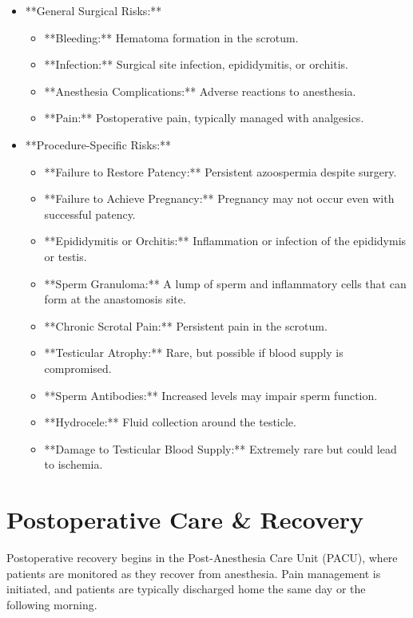 \begin{itemize}
  \item **General Surgical Risks:**
    \begin{itemize}
      \item **Bleeding:** Hematoma formation in the scrotum.
      \item **Infection:** Surgical site infection, epididymitis, or orchitis.
      \item **Anesthesia Complications:** Adverse reactions to anesthesia.
      \item **Pain:** Postoperative pain, typically managed with analgesics.
    \end{itemize}
  
  \item **Procedure-Specific Risks:**
    \begin{itemize}
      \item **Failure to Restore Patency:** Persistent azoospermia despite surgery.
      \item **Failure to Achieve Pregnancy:** Pregnancy may not occur even with successful patency.
      \item **Epididymitis or Orchitis:** Inflammation or infection of the epididymis or testis.
      \item **Sperm Granuloma:** A lump of sperm and inflammatory cells that can form at the anastomosis site.
      \item **Chronic Scrotal Pain:** Persistent pain in the scrotum.
      \item **Testicular Atrophy:** Rare, but possible if blood supply is compromised.
      \item **Sperm Antibodies:** Increased levels may impair sperm function.
      \item **Hydrocele:** Fluid collection around the testicle.
      \item **Damage to Testicular Blood Supply:** Extremely rare but could lead to ischemia.
    \end{itemize}
\end{itemize}

\section*{Postoperative Care \& Recovery}
Postoperative recovery begins in the Post-Anesthesia Care Unit (PACU), where patients are monitored as they recover from anesthesia. Pain management is initiated, and patients are typically discharged home the same day or the following morning. 

